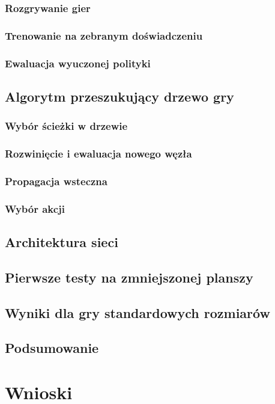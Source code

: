 \documentclass[licencjacka]{pracamgr}
\begin{document}
\subsection{Rozgrywanie gier}

\subsection{Trenowanie na zebranym doświadczeniu}

\subsection{Ewaluacja wyuczonej polityki}

\section{Algorytm przeszukujący drzewo gry}

\subsection{Wybór ścieżki w drzewie}

\subsection{Rozwinięcie i ewaluacja nowego węzła}

\subsection{Propagacja wsteczna}

\subsection{Wybór akcji}

\section{Architektura sieci}

\section{Pierwsze testy na zmniejszonej planszy}

\section{Wyniki dla gry standardowych rozmiarów}

\section{Podsumowanie}

\chapter{Wnioski}

\begin{thebibliography}{99}

\end{thebibliography}
\end{document}
